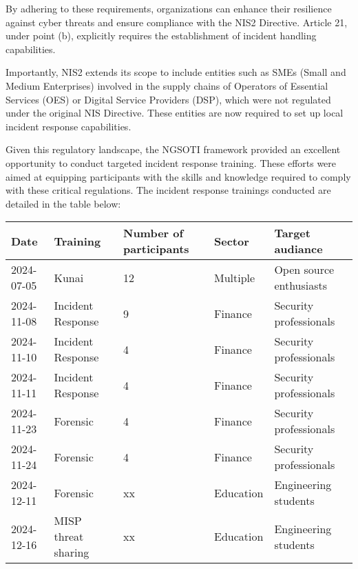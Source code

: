 By adhering to these requirements, organizations can enhance their resilience against cyber threats and ensure compliance with the NIS2 Directive. Article 21, under point (b), explicitly requires the establishment of incident handling capabilities.

Importantly, NIS2 extends its scope to include entities such as SMEs (Small and Medium Enterprises) involved in the supply chains of Operators of Essential Services (OES) or Digital Service Providers (DSP), which were not regulated under the original NIS Directive. These entities are now required to set up local incident response capabilities.

Given this regulatory landscape, the NGSOTI framework provided an excellent opportunity to conduct targeted incident response training. These efforts were aimed at equipping participants with the skills and knowledge required to comply with these critical regulations. The incident response trainings conducted are detailed in the table below:


\begin{table}
    \begin{tabular}{lllll}
        \hline
        Date & Training  & Number of participants & Sector & Target audiance\\
        \hline
        2024-07-05 & Kunai & 12 & Multiple & Open source enthusiasts \\
        2024-11-08 & Incident Response & 9 & Finance & Security professionals\\
        2024-11-10 & Incident Response & 4 & Finance & Security professionals\\
        2024-11-11 & Incident Response & 4 & Finance & Security professionals\\
        2024-11-23 & Forensic & 4 & Finance & Security professionals\\
        2024-11-24 & Forensic & 4 & Finance & Security professionals\\
        2024-12-11 & Forensic & xx & Education & Engineering students \\
        2024-12-16 & MISP threat sharing & xx & Education & Engineering students \\
        \hline
    \end{tabular}
\end{table}

